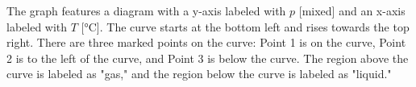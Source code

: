 The graph features a diagram with a y-axis labeled with \( p \) [mixed] and an x-axis labeled with \( T \) [°C]. The curve starts at the bottom left and rises towards the top right. There are three marked points on the curve: Point 1 is on the curve, Point 2 is to the left of the curve, and Point 3 is below the curve. The region above the curve is labeled as "gas," and the region below the curve is labeled as "liquid."